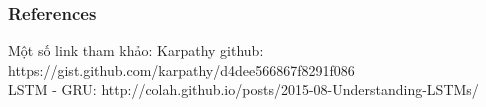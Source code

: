 \documentclass{beamer}
\begin{document}
\begin{frame}
	\frametitle{References}
	Một số link tham khảo:
	Karpathy github:
	https://gist.github.com/karpathy/d4dee566867f8291f086\\
	LSTM - GRU:
	http://colah.github.io/posts/2015-08-Understanding-LSTMs/
\end{frame}



\begin{frame}
\Huge{}
\end{frame}

\end{document}
